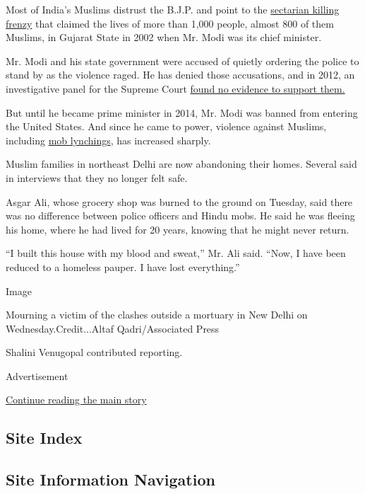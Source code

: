 Most of India's Muslims distrust the B.J.P. and point to the
\href{https://www.nytimes.com/interactive/2014/04/06/world/asia/modi-gujarat-riots-timeline.html\#/\#time287_8514}{sectarian
killing frenzy} that claimed the lives of more than 1,000 people, almost
800 of them Muslims, in Gujarat State in 2002 when Mr. Modi was its
chief minister.

Mr. Modi and his state government were accused of quietly ordering the
police to stand by as the violence raged. He has denied those
accusations, and in 2012, an investigative panel for the Supreme Court
\href{http://archive.indianexpress.com/news/SIT-report-clears-Modi--61-others/935226}{found
no evidence to support them.}

But until he became prime minister in 2014, Mr. Modi was banned from
entering the United States. And since he came to power, violence against
Muslims, including
\href{https://www.nytimes.com/2019/02/18/world/asia/india-cow-religious-attacks.html}{mob
lynchings}, has increased sharply.

Muslim families in northeast Delhi are now abandoning their homes.
Several said in interviews that they no longer felt safe.

Asgar Ali, whose grocery shop was burned to the ground on Tuesday, said
there was no difference between police officers and Hindu mobs. He said
he was fleeing his home, where he had lived for 20 years, knowing that
he might never return.

``I built this house with my blood and sweat,'' Mr. Ali said. ``Now, I
have been reduced to a homeless pauper. I have lost everything.''

Image

Mourning a victim of the clashes outside a mortuary in New Delhi on
Wednesday.Credit...Altaf Qadri/Associated Press

Shalini Venugopal contributed reporting.

Advertisement

\protect\hyperlink{after-bottom}{Continue reading the main story}

\hypertarget{site-index}{%
\subsection{Site Index}\label{site-index}}

\hypertarget{site-information-navigation}{%
\subsection{Site Information
Navigation}\label{site-information-navigation}}

